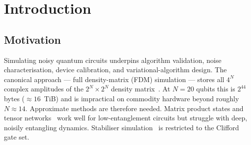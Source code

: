 \documentclass[11pt,a4paper]{article}
\begin{document}
\begin{abstract}
For empirical validation we deliberately constrain claims to \emph{one} tested regime:
a head-to-head comparison against Cirq's \texttt{DensityMatrixSimulator}~\cite{cirq} on
a random dense circuit of depth 13 with per-qubit depolarising noise $p=10^{-3}$, over
$N=4,\ldots,20$ qubits, three trials per point. LRET overtakes Cirq's runtime at
$N\!\ge\!8$ and reaches a $59.1\times$ speedup at $N=14$ with state fidelity
$\ge 0.986$; it completes circuits at $N=16,18$ where the Cirq density-matrix reference
exceeds available RAM (68.7\,GB and 1099.5\,GB required, respectively). Final ranks
stay at or below 152 even at $N=18$ ($0.058\%$ of the full Hilbert dimension), empirically
confirming the low-rank assumption of~\cite{chen2021lret}. All other implementation
subsystems (MPI, GPU, additional parallel modes, autodiff) have been verified with
smoke and unit tests but are not benchmarked in this report; their performance
characterisation is explicitly deferred to future work. We conclude with the Proxima
AI orchestration system, a Python agent-framework layer that manages the full
clone$\to$build$\to$run$\to$analyse workflow over the LRET simulator and five other
quantum backends.
\end{abstract}

\tableofcontents
\clearpage

\section{Introduction}

\subsection{Motivation}

Simulating noisy quantum circuits underpins algorithm validation, noise characterisation,
device calibration, and variational-algorithm design. The canonical approach --- full
density-matrix (FDM) simulation --- stores all $4^N$ complex amplitudes of the
$2^N \times 2^N$ density matrix~\cite{nielsenchuang2010}. At $N = 20$ qubits this is
$2^{44}$ bytes ($\approx 16$~TiB) and is impractical on commodity hardware beyond roughly
$N \approx 14$. Approximate methods are therefore needed. Matrix product states
and tensor networks~\cite{orus2014tn} work well for low-entanglement circuits but
struggle with deep, noisily entangling dynamics. Stabiliser
simulation~\cite{gottesman1997} is restricted to the Clifford gate set.
\end{document}
